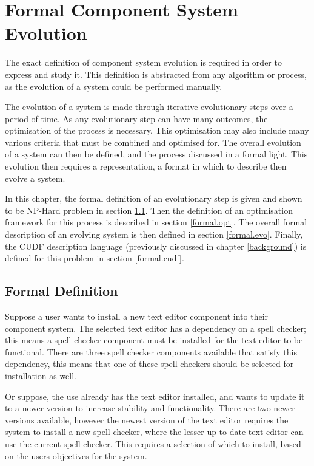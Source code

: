 \chapter{Formal Component System Evolution}
\label{cdr}
The exact definition of component system evolution is required in order to express and study it.
This definition is abstracted from any algorithm or process, as the evolution of a system could be performed manually.

The evolution of a system is made through iterative evolutionary steps over a period of time. 
As any evolutionary step can have many outcomes, the optimisation of the process is necessary.
This optimisation may also include many various criteria that must be combined and optimised for.
The overall evolution of a system can then be defined, and the process discussed in a formal light.
This evolution then requires a representation, a format in which to describe then evolve a system.

In this chapter, the formal definition of an evolutionary step is given and shown to be NP-Hard problem in section \ref{formal.step}.
Then the definition of an optimisation framework for this process is described in section \ref{formal.opt}.
The overall formal description of an evolving system is then defined in section \ref{formal.evo}.
Finally, the CUDF description language (previously discussed in chapter \ref{background}) is defined for this problem in section \ref{formal.cudf}.

\section{Formal Definition}
\label{formal.step}
Suppose a user wants to install a new text editor component into their component system.
The selected text editor has a dependency on a spell checker;
this means a spell checker component must be installed for the text editor to be functional.
There are three spell checker components available that satisfy this dependency,
this means that one of these spell checkers should be selected for installation as well.

Or suppose, the use already has the text editor installed, and wants to update it to a newer version to increase stability and functionality.
There are two newer versions available, however the newest version of the text editor requires the system to install a new spell checker,
where the lesser up to date text editor can use the current spell checker.
This requires a selection of which to install, based on the users objectives for the system.

